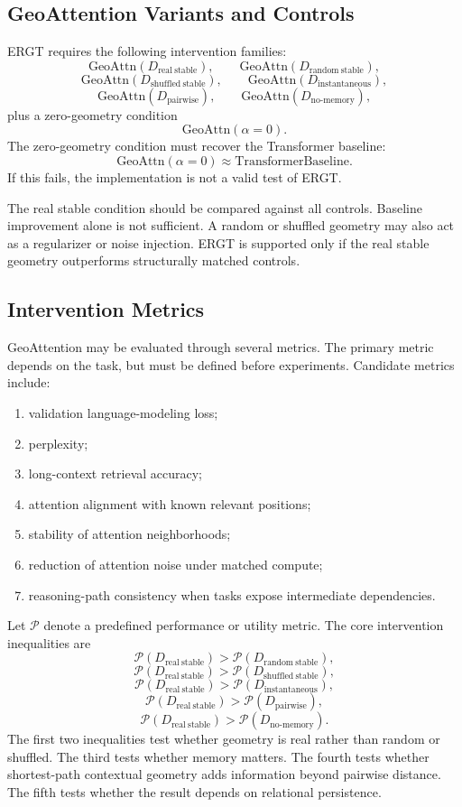 \documentclass[11pt]{article}
\begin{document}
\subsection{GeoAttention Variants and Controls}

ERGT requires the following intervention families:
\[
\mathrm{GeoAttn}(D_{\mathrm{real\ stable}}),
\qquad
\mathrm{GeoAttn}(D_{\mathrm{random\ stable}}),
\]
\[
\mathrm{GeoAttn}(D_{\mathrm{shuffled\ stable}}),
\qquad
\mathrm{GeoAttn}(D_{\mathrm{instantaneous}}),
\]
\[
\mathrm{GeoAttn}(D_{\mathrm{pairwise}}),
\qquad
\mathrm{GeoAttn}(D_{\mathrm{no\text{-}memory}}),
\]
plus a zero-geometry condition
\[
\mathrm{GeoAttn}(\alpha=0).
\]
The zero-geometry condition must recover the Transformer baseline:
\[
\mathrm{GeoAttn}(\alpha=0)
\approx
\mathrm{TransformerBaseline}.
\]
If this fails, the implementation is not a valid test of ERGT.

The real stable condition should be compared against all controls. Baseline improvement alone is not sufficient. A random or shuffled geometry may also act as a regularizer or noise injection. ERGT is supported only if the real stable geometry outperforms structurally matched controls.

\subsection{Intervention Metrics}

GeoAttention may be evaluated through several metrics. The primary metric depends on the task, but must be defined before experiments. Candidate metrics include:
\begin{enumerate}[label=(\roman*)]
    \item validation language-modeling loss;
    \item perplexity;
    \item long-context retrieval accuracy;
    \item attention alignment with known relevant positions;
    \item stability of attention neighborhoods;
    \item reduction of attention noise under matched compute;
    \item reasoning-path consistency when tasks expose intermediate dependencies.
\end{enumerate}

Let $\mathcal{P}$ denote a predefined performance or utility metric. The core intervention inequalities are
\[
\mathcal{P}(D_{\mathrm{real\ stable}})
>
\mathcal{P}(D_{\mathrm{random\ stable}}),
\]
\[
\mathcal{P}(D_{\mathrm{real\ stable}})
>
\mathcal{P}(D_{\mathrm{shuffled\ stable}}),
\]
\[
\mathcal{P}(D_{\mathrm{real\ stable}})
>
\mathcal{P}(D_{\mathrm{instantaneous}}),
\]
\[
\mathcal{P}(D_{\mathrm{real\ stable}})
>
\mathcal{P}(D_{\mathrm{pairwise}}),
\]
\[
\mathcal{P}(D_{\mathrm{real\ stable}})
>
\mathcal{P}(D_{\mathrm{no\text{-}memory}}).
\]
The first two inequalities test whether geometry is real rather than random or shuffled. The third tests whether memory matters. The fourth tests whether shortest-path contextual geometry adds information beyond pairwise distance. The fifth tests whether the result depends on relational persistence.
\end{document}

